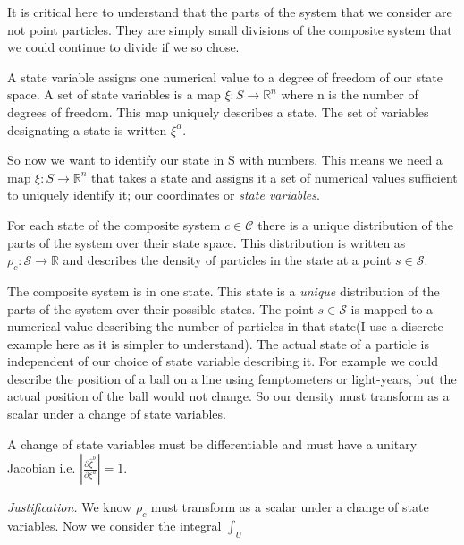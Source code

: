 \documentclass{article}
\begin{document}
	It is critical here to understand that the parts of the system that we consider are not point particles. They are simply small divisions of the composite system that we could continue to divide if we so chose.

\begin{defn}
	A state variable assigns one numerical value to a degree of freedom of our state space. A set of state variables is a map $\xi : S \rightarrow \mathbb{R}^n $ where n is the number of degrees of freedom. This map uniquely describes a state. The set of variables designating a state is written $\xi^\alpha$.
\end{defn}

So now we want to identify our state in S with numbers. This means we need a map $\xi : S \rightarrow \mathbb{R}^n $ that takes a state and assigns it a set of numerical values sufficient to uniquely identify it; our coordinates or \textit{state variables}.

\begin{defn}
	For each state of the composite system $c \in \mathcal{C}$ there is a unique distribution of the parts of the system over their state space. This distribution is written as $\rho_c: \mathcal{S} \rightarrow \mathbb{R}$ and describes the density of particles in the state at a point $s \in \mathcal{S}$.
\end{defn}

	The composite system is in one state. This state is a \textit{unique} distribution of the parts of the system over their possible states. The point $s \in \mathcal{S}$ is mapped to a numerical value describing the number of particles in that state(I  use a discrete example here as it is simpler to understand). The actual state of a particle is independent of our choice of state variable describing it. For example we could describe the position of a ball on a line using femptometers or light-years, but the actual position of the ball would not change. So our density must transform as a scalar under a change of state variables.

\begin{prop}
	A change of state variables must be differentiable and must have a unitary Jacobian i.e. $\left|\frac{\partial\hat{\xi}^b}{\partial\xi^a}\right| = 1$.
\end{prop}

	\textit{Justification.} We know $\rho_c$ must transform as a scalar under a change of state variables. Now we consider the integral $\int_U$
\end{document}
